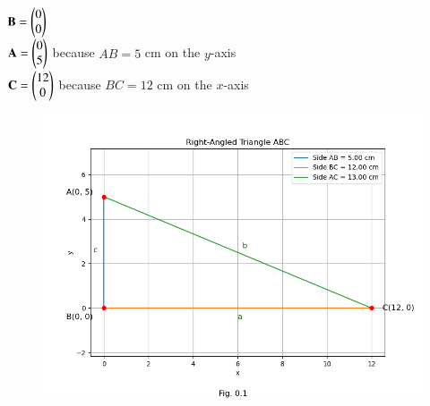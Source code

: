 \documentclass[journal]{IEEEtran}
\begin{document}
      $\mathbf{B} = \begin{pmatrix}0\\0\end{pmatrix}$\\
      $\mathbf{A} = \begin{pmatrix}0\\5\end{pmatrix}$ because $AB = 5$ cm on the $y$-axis\\
      $\mathbf{C} = \begin{pmatrix}12\\0\end{pmatrix}$ because $BC = 12$ cm on the $x$-axis\\


    \begin{figure}[h]
       \centering
       \includegraphics[width=0.9\columnwidth]{figs/fig1.png}
       \caption{}
       \label{graph}
    \end{figure}
\end{document}
